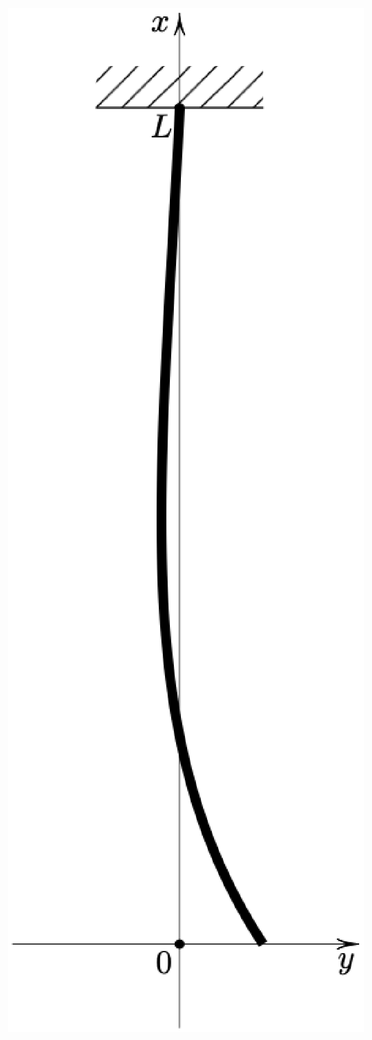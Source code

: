 \begin{figure}[H]
    \includegraphics[scale=0.4]{Imagenes/Cadena_Oscilante_04_png.eps}

\end{figure}
